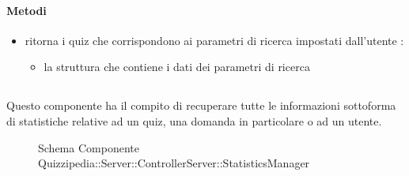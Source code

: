 \paragraph{Metodi}
\begin{itemize}
\item {}
\newline
ritorna i quiz che corrispondono ai parametri di ricerca impostati dall'utente
\newline
{} :
\begin{itemize}
\item {}
\newline
la struttura che contiene i dati dei parametri di ricerca
\end{itemize}
\end{itemize}
\subsection{}
Questo componente ha il compito di recuperare tutte le informazioni sottoforma di statistiche relative ad un quiz, una domanda in particolare o ad un utente.
\begin{figure}[H]
\centering
\noindent{}
\caption[Schema Componente Quizzipedia::Server::ControllerServer::StatisticsManager]{Schema Componente Quizzipedia::Server::ControllerServer::StatisticsManager}
\end{figure}

